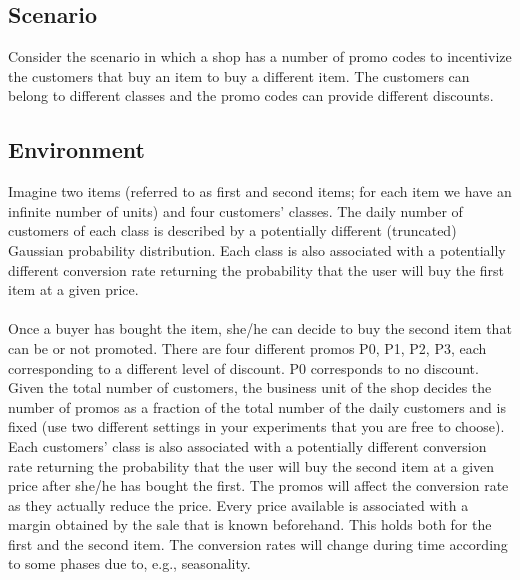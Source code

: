 \subsection*{Scenario}
 Consider the scenario in which a shop has a number of promo codes to incentivize the customers that buy an item to buy a different item. The customers can belong to different classes and the promo codes can provide different discounts. 
\subsection*{Environment}
 Imagine two items (referred to as first and second items; for each item we have an infinite number of units) and four customers’ classes. The daily number of customers of each class is described by a potentially different (truncated) Gaussian probability distribution. Each class is also associated with a potentially different conversion rate returning the probability that the user will buy the first item at a given price.
\paragraph{}
Once a buyer has bought the item, she/he can decide to buy the second item that can be or not promoted. There are four different promos P0, P1, P2, P3, each corresponding to a different level of discount. P0 corresponds to no discount. Given the total number of customers, the business unit of the shop decides the number of promos as a fraction of the total number of the daily customers and is fixed (use two different settings in your experiments that you are free to choose). Each customers’ class is also associated with a potentially different conversion rate returning the probability that the user will buy the second item at a given price after she/he has bought the first. The promos will affect the conversion rate as they actually reduce the price. 
Every price available is associated with a margin obtained by the sale that is known beforehand. This holds both for the first and the second item. 
The conversion rates will change during time according to some phases due to, e.g., seasonality.
